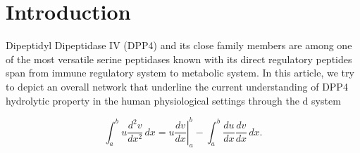 \section{Introduction}
\label{intro} 

Dipeptidyl Dipeptidase IV (DPP4) and its close family members are among one of the most versatile serine peptidases known with its direct regulatory peptides span from immune regulatory system to metabolic system. In this article, we try to depict an overall network that underline the current understanding of DPP4 hydrolytic property in the human physiological settings through the d system 

\begin{equation}
\label{eqn:drag}
	\int_a^bu\frac{d^2v}{dx^2}\,dx
	=\left.u\frac{dv}{dx}\right|_a^b
	-\int_a^b\frac{du}{dx}\frac{dv}{dx}\,dx.
\end{equation}
